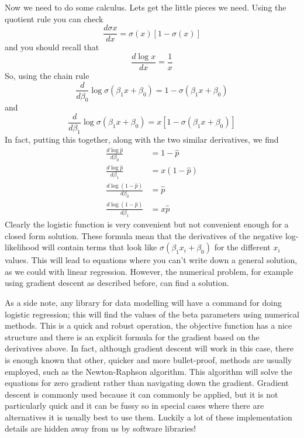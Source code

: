 \documentclass[12pt]{article}
\begin{document}
Now we need to do some calculus. Lets get the little pieces we
need. Using the quotient rule you can check
\begin{equation}
  \frac{d\sigma{x}}{dx}=\sigma(x)[1-\sigma(x)]
\end{equation}
and you should recall that
\begin{equation}
  \frac{d\log{x}}{dx}=\frac{1}{x}
\end{equation}
So, using the chain rule
\begin{equation}
  \frac{d}{d\beta_0}\log{\sigma(\beta_1x+\beta_0)}=1-\sigma(\beta_1x+\beta_0)
\end{equation}
and
\begin{equation}
  \frac{d}{d\beta_1}\log{\sigma(\beta_1x+\beta_0)}=x[1-\sigma(\beta_1x+\beta_0)]
\end{equation}
In fact, putting this together, along with the two similar derivatives, we find
\begin{align}
  \frac{d\log{\hat{p}}}{d\beta_0}&=1-\hat{p}\\  \nonumber
    \frac{d\log{\hat{p}}}{d\beta_1}&=x(1-\hat{p})\\ \nonumber
  \frac{d\log{(1-\hat{p})}}{d\beta_0}&=\hat{p}\\ \nonumber
  \frac{d\log{(1-\hat{p})}}{d\beta_1}&=x\hat{p}
\end{align}
Clearly the logistic function is very convenient but not convenient
enough for a closed form solution. These formula mean that the
derivatives of the negative log-likelihood will contain terms that
look like $\sigma(\beta_1x_i+\beta_0)$ for the different $x_i$
values. This will lead to equations where you can't write down a
general solution, as we could with linear regression. However, the
numerical problem, for example using gradient descent as described
before, can find a solution.

As a side note, any library for data modelling will have a command for
doing logistic regression; this will find the values of the beta
parameters using numerical methods. This is a quick and robust
operation, the objective function has a nice structure and there is an
explicit formula for the gradient based on the derivatives above. In
fact, although gradient descent will work in this case, there is
enough known that other, quicker and more bullet-proof, methods are
usually employed, such as the Newton-Raphson algorithm. This algorithm
will solve the equations for zero gradient rather than navigating down
the gradient. Gradient descent is commonly used because it can
commonly be applied, but it is not particularly quick and it can be
fussy so in special cases where there are alternatives it is usually
best to use them. Luckily a lot of these implementation details are
hidden away from us by software libraries!
\end{document}
